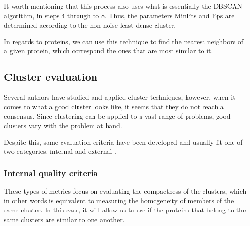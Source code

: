 It worth mentioning that this process also uses what is essentially the DBSCAN algorithm, in steps 4 through to 8. Thus, the parameters MinPts and Eps are determined according to the non-noise least dense cluster. 

In regards to proteins, we can use this technique to find the nearest neighbors of a given protein, which correspond the ones that are most similar to it. 

\subsection{Cluster evaluation}
Several authors have studied and applied cluster techniques, however, when it comes to what a good cluster looks like, it seems that they do not reach a consensus. Since clustering can be applied to a vast range of problems, good clusters vary with the problem at hand. 

Despite this, some evaluation criteria have been developed and usually fit one of two categories, internal and external \cite{duda2012pattern} \cite{rokach2005clustering}.

\subsubsection{Internal quality criteria}

These types of metrics focus on evaluating the compactness of the clusters, which in other words is equivalent to measuring the homogeneity of members of the same cluster. In this case, it will allow us to see if the proteins that belong to the same clusters are similar to one another.

